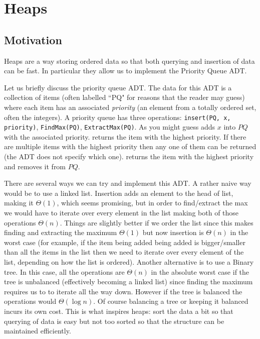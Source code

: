 \section{Heaps}\label{sec:heaps}

\subsection{Motivation}

Heaps are a way storing ordered data so that both querying and insertion of data can be fast. In particular they allow us to implement the Priority Queue ADT.

Let us briefly discuss the priority queue ADT. The data for this ADT is a collection of items (often labelled ``PQ" for reasons that the reader may guess) where each item has an associated \textit{priority} (an element from a totally ordered set, often the integers). A priority queue has three operations: \texttt{insert(PQ, x, priority)}, \texttt{FindMax(PQ)}, \texttt{ExtractMax(PQ)}. As you might guess  adds $x$ into $PQ$ with the associated priority.  returns the item with the highest priority. If there are multiple items with the highest priority then any one of them can be returned (the ADT does not specify which one).  returns the item with the highest priority and removes it from $PQ$.

There are several ways we can try and implement this ADT. A rather naive way would be to use a linked list. Insertion adds an element to the head of list, making it $\Theta(1)$, which seems promising, but in order to find/extract the max we would have to iterate over every element in the list making both of those operations $\Theta(n)$. Things are slightly better if we order the list since this makes finding and extracting the maximum $\Theta(1)$ but now insertion is $\Theta(n)$ in the worst case (for example, if the item being added being added is bigger/smaller than all the items in the list then we need to iterate over every element of the list, depending on how the list is ordered). 
Another alternative is to use a Binary tree. In this case, all the operations are $\Theta(n)$ in the absolute worst case if the tree is unbalanced (effectively becoming a linked list) since finding the maximum requires us to to iterate all the way down. However if the tree is balanced the operations would $\Theta(\log n)$. Of course balancing a tree or keeping it balanced incurs its own cost. This is what inspires heaps: sort the data a bit so that querying of data is easy but not too sorted so that the structure can be maintained efficiently.

